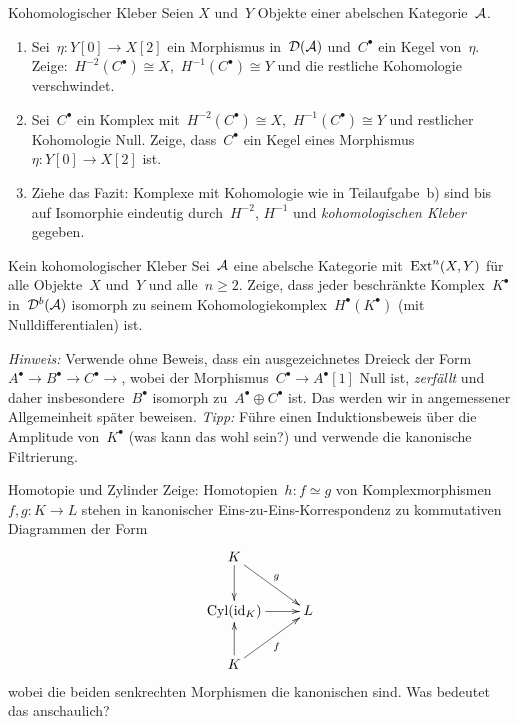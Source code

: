 \documentclass{uebblatt}
\begin{document}
\begin{aufgabe}{Kohomologischer Kleber}
Seien $X$ und~$Y$ Objekte einer abelschen Kategorie~$\mathcal{A}$.
\begin{enumerate}
\item Sei~$\eta : Y[0] \to X[2]$ ein Morphismus in~$\mathcal{D}(\mathcal{A})$ und~$C^\bullet$ ein Kegel
von~$\eta$. \\ Zeige:~$H^{-2}(C^\bullet) \cong X$,~$H^{-1}(C^\bullet)
\cong Y$ und die restliche Kohomologie verschwindet.
\item Sei~$C^\bullet$ ein Komplex mit~$H^{-2}(C^\bullet) \cong
X$,~$H^{-1}(C^\bullet) \cong Y$ und restlicher Kohomologie Null. Zeige, dass~$C^\bullet$
ein Kegel eines Morphismus~$\eta : Y[0] \to X[2]$ ist.
\item Ziehe das Fazit: Komplexe mit Kohomologie wie in Teilaufgabe~b) sind
bis auf Isomorphie eindeutig durch~$H^{-2}$, $H^{-1}$ und \emph{kohomologischen
Kleber} gegeben.
\end{enumerate}
\end{aufgabe}

\begin{aufgabe}{Kein kohomologischer Kleber}
Sei~$\mathcal{A}$ eine abelsche Kategorie mit~$\mathrm{Ext}^n(X,Y)$ für alle Objekte~$X$ und~$Y$
und alle~$n \geq 2$. Zeige, dass jeder beschränkte Komplex~$K^\bullet$
in~$\mathcal{D}^b(\mathcal{A})$ isomorph zu seinem Kohomologiekomplex~$H^\bullet(K^\bullet)$ (mit
Nulldifferentialen) ist.

{\scriptsize \emph{Hinweis:} Verwende ohne Beweis, dass ein ausgezeichnetes
Dreieck der Form~$A^\bullet \to B^\bullet \to C^\bullet \to$, wobei der
Morphismus~$C^\bullet \to A^\bullet[1]$ Null ist, \emph{zerfällt} und daher
insbesondere~$B^\bullet$ isomorph zu~$A^\bullet \oplus C^\bullet$ ist. Das
werden wir in angemessener Allgemeinheit später beweisen.
\emph{Tipp:}
Führe einen Induktionsbeweis über die Amplitude von~$K^\bullet$
(was kann das wohl sein?) und verwende die kanonische Filtrierung.\par}
\end{aufgabe}

\begin{aufgabe}{Homotopie und Zylinder}
Zeige: Homotopien~$h : f \simeq g$ von Komplexmorphismen~$f, g : K \to L$
stehen in kanonischer Eins-zu-Eins-Korrespondenz zu kommutativen Diagrammen der
Form
\[ \xymatrix{
  K \ar[rd]^g \ar[d] \\
  \operatorname{Cyl}(\id_K) \ar[r] & L \\
  K \ar[ru]_f \ar[u]
} \]
wobei die beiden senkrechten Morphismen die kanonischen sind. Was bedeutet das
anschaulich?
\end{aufgabe}
\end{document}
